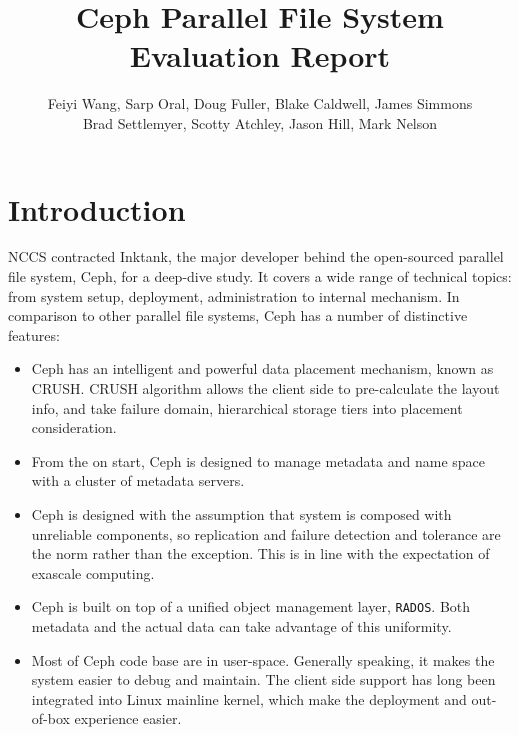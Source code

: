 \documentclass{article}
\title{Ceph Parallel File System Evaluation Report}
\author{Feiyi Wang, Sarp Oral, Doug Fuller, Blake Caldwell, James Simmons\\
Brad Settlemyer, Scotty Atchley, Jason Hill, Mark Nelson}
\begin{document}


\pagebreak
\thispagestyle{empty}
\tableofcontents

\pagebreak
\thispagestyle{empty}
\listoffigures

\clearpage
{}


\section{Introduction}

NCCS contracted Inktank, the major developer behind the open-sourced parallel
file system, Ceph, for a deep-dive study. It covers a wide range of technical
topics: from system setup, deployment, administration to internal mechanism. In
comparison to other parallel file systems, Ceph has a number of distinctive
features:

\begin{itemize}
  \item Ceph has an intelligent and powerful data placement mechanism, known as
  CRUSH. CRUSH algorithm allows the client side to pre-calculate the layout
  info, and take failure domain, hierarchical storage tiers into placement
  consideration.
  
  \item From the on start, Ceph is designed to manage metadata and name space
  with a cluster of metadata servers.

\item Ceph is designed with the assumption that system is composed with
unreliable components, so replication and failure detection and tolerance are
the norm rather than the exception. This is in line with the expectation of
exascale computing.

\item Ceph is built on top of a unified object management layer,
\texttt{RADOS}. Both metadata and the actual data can take advantage of this
uniformity.

\item Most of Ceph code base are in user-space. Generally speaking, it makes the
system easier to debug and maintain. The client side support has long been
integrated into Linux mainline kernel, which make the deployment and out-of-box
experience easier.

\end{itemize}
\end{document}
